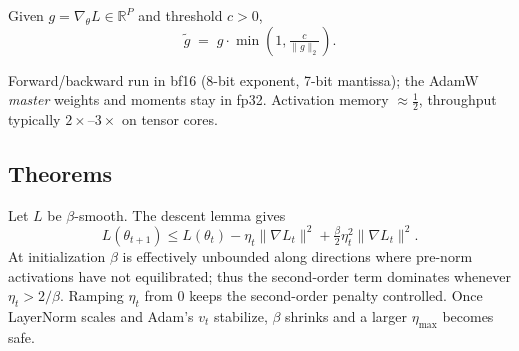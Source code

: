 \begin{definition}
Given $g=\nabla_\theta L\in\mathbb{R}^P$ and threshold $c>0$,
\[
\widetilde{g} \;=\; g\cdot\min\!\left(1,\tfrac{c}{\|g\|_2}\right).
\]
\end{definition}

\begin{definition}
Forward/backward run in bf16 (8-bit exponent, 7-bit mantissa); the AdamW \emph{master} weights and moments stay in fp32. Activation memory $\approx \tfrac{1}{2}$, throughput typically $2\times$--$3\times$ on tensor cores.
\end{definition}

\subsection*{Theorems}

\begin{theorem}
Let $L$ be $\beta$-smooth. The descent lemma gives
\[
L(\theta_{t+1}) \le L(\theta_t) - \eta_t\|\nabla L_t\|^2 + \tfrac{\beta}{2}\eta_t^2\|\nabla L_t\|^2.
\]
At initialization $\beta$ is effectively unbounded along directions where pre-norm activations have not equilibrated; thus the second-order term dominates whenever $\eta_t > 2/\beta$. Ramping $\eta_t$ from $0$ keeps the second-order penalty controlled. Once LayerNorm scales and Adam's $v_t$ stabilize, $\beta$ shrinks and a larger $\eta_{\max}$ becomes safe.
\end{theorem}

